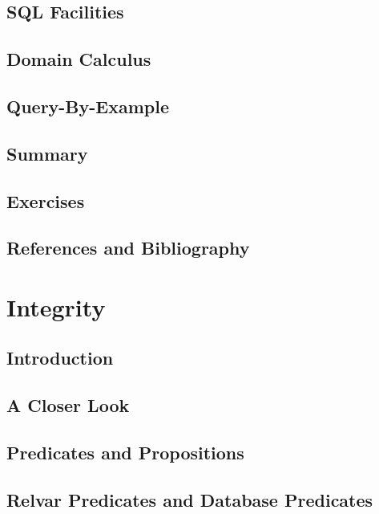 \documentclass{book}
\begin{document}
\section{SQL Facilities}

\section{Domain Calculus}

\section{Query-By-Example}

\section{Summary}

\section{Exercises}

\section{References and Bibliography}










\chapter{Integrity}

\section{Introduction}

\section{A Closer Look}

\section{Predicates and Propositions }

\section{Relvar Predicates and Database Predicates}
\end{document}
